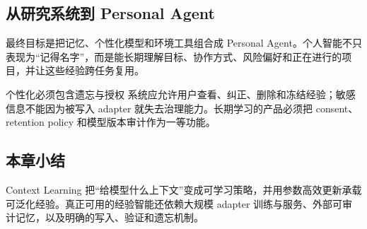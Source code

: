 
\subsection{从研究系统到 Personal Agent}

最终目标是把记忆、个性化模型和环境工具组合成 Personal Agent。个人智能不只表现为“记得名字”，而是能长期理解目标、协作方式、风险偏好和正在进行的项目，并让这些经验跨任务复用。


\begin{warningbox}{个性化必须包含遗忘与授权}
系统应允许用户查看、纠正、删除和冻结经验；敏感信息不能因为被写入 adapter 就失去治理能力。长期学习的产品必须把 consent、retention policy 和模型版本审计作为一等功能。
\end{warningbox}

\subsection{本章小结}

Context Learning 把“给模型什么上下文”变成可学习策略，并用参数高效更新承载可泛化经验。真正可用的经验智能还依赖大规模 adapter 训练与服务、外部可审计记忆，以及明确的写入、验证和遗忘机制。
